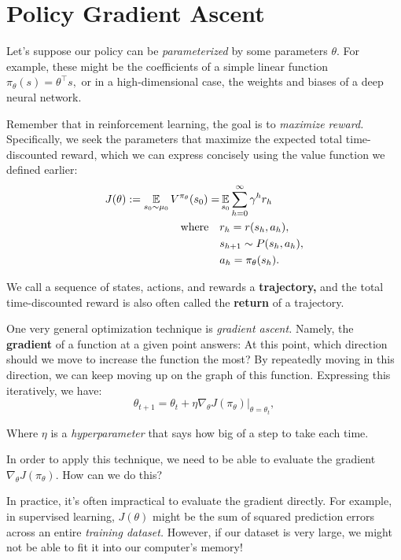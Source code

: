 \documentclass[../main/main]{subfiles}
\begin{document}
\section{Policy Gradient Ascent}

Let's suppose our policy can be \emph{parameterized} by some parameters $\theta.$ For example, these might be the coefficients of a simple linear function $\pi_\theta(s) = \theta^\top s,$ or in a high-dimensional case, the weights and biases of a deep neural network.

Remember that in reinforcement learning, the goal is to \emph{maximize reward.} Specifically, we seek the parameters that maximize the expected total time-discounted reward, which we can express concisely using the value function we defined earlier: \[ \begin{split}
    J(\theta) := \operatorname*{\mathbb{E}}_{s_0 \sim \mu_0} V^{\pi_\theta} (s_0) = & \operatorname*{\mathbb{E}}_{s_0} \sum_{h=0}^{\infty} \gamma^h r_h \\
    \text{where} \quad & r_h = r(s_h, a_h), \\
    & s_{h+1} \sim P(s_h, a_h), \\
    & a_h = \pi_\theta(s_h).
\end{split} \]

We call a sequence of states, actions, and rewards a \textbf{trajectory,} and the total time-discounted reward is also often called the \textbf{return} of a trajectory.

One very general optimization technique is \emph{gradient ascent.} Namely, the \textbf{gradient} of a function at a given point answers: At this point, which direction should we move to increase the function the most? By repeatedly moving in this direction, we can keep moving up on the graph of this function. Expressing this iteratively, we have: \[
    \theta_{t+1} = \theta_t + \eta \nabla_\theta J(\pi_\theta) \Big|_{\theta = \theta_t},
\]

Where $\eta$ is a \emph{hyperparameter} that says how big of a step to take each time.

In order to apply this technique, we need to be able to evaluate the gradient $\nabla_\theta J(\pi_\theta).$ How can we do this?

In practice, it's often impractical to evaluate the gradient directly. For example, in supervised learning, $J(\theta)$ might be the sum of squared prediction errors across an entire \emph{training dataset.} However, if our dataset is very large, we might not be able to fit it into our computer's memory!
\end{document}
